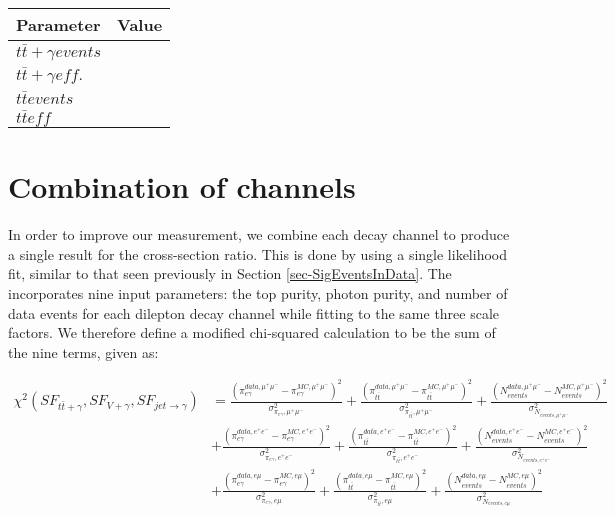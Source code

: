 \begin{table}
\centering
\begin{tabular}{|l|l|}
\hline
	\textbf{Parameter} & \textbf{Value} \\
\hline
	$t\bar{t}+\gamma events$ & \\
	$t\bar{t}+\gamma eff.$ & \\
	$t\bar{t} events$ & \\
	$t\bar{t} eff$ & \\
\hline
\end{tabular}
\caption{}
\end{table}	

\section{Combination of channels} \label{sec-CombinationOfChannels}

In order to improve our measurement, we combine each decay channel to produce a single result for the cross-section ratio. This is done by using a single likelihood fit, similar to that seen previously in Section \ref{sec-SigEventsInData}. The incorporates nine input parameters: the top purity, photon purity, and number of data events for each dilepton decay channel while fitting to the same three scale factors. We therefore define a modified chi-squared calculation to be the sum of the nine terms, given as:

\begin{equation}
\begin{split}
\chi^2(SF_{t\bar{t}+\gamma},SF_{V+\gamma},SF_{jet\to\gamma}) & = \frac{\left(\pi^{data,\mu^+\mu^-}_{e\gamma} - \pi^{MC,\mu^+\mu^-}_{e\gamma}\right)^2}{\sigma^2_{\pi_{e\gamma},\mu^+\mu^-}} + \frac{\left(\pi^{data,\mu^+\mu^-}_{t\bar{t}} - \pi^{MC,\mu^+\mu^-}_{t\bar{t}}\right)^2}{\sigma^2_{\pi_{t\bar{t}},\mu^+\mu^-}} + \frac{\left(N^{data,\mu^+\mu^-}_{events} - N^{MC,\mu^+\mu^-}_{events}\right)^2}{\sigma^2_{N_{events,\mu^+\mu^-}}} \\
& + \frac{\left(\pi^{data,e^+e^-}_{e\gamma} - \pi^{MC,e^+e^-}_{e\gamma}\right)^2}{\sigma^2_{\pi_{e\gamma},e^+e^-}} + \frac{\left(\pi^{data,e^+e^-}_{t\bar{t}} - \pi^{MC,e^+e^-}_{t\bar{t}}\right)^2}{\sigma^2_{\pi_{t\bar{t}},e^+e^-}} + \frac{\left(N^{data,e^+e^-}_{events} - N^{MC,e^+e^-}_{events}\right)^2}{\sigma^2_{N_{events,e^+e^-}}} \\
& + \frac{\left(\pi^{data,e\mu}_{e\gamma} - \pi^{MC,e\mu}_{e\gamma}\right)^2}{\sigma^2_{\pi_{e\gamma},e\mu}} + \frac{\left(\pi^{data,e\mu}_{t\bar{t}} - \pi^{MC,e\mu}_{t\bar{t}}\right)^2}{\sigma^2_{\pi_{t\bar{t}},e\mu}} + \frac{\left(N^{data,e\mu}_{events} - N^{MC,e\mu}_{events}\right)^2}{\sigma^2_{N_{events,e\mu}}} 
\end{split}
\end{equation}

